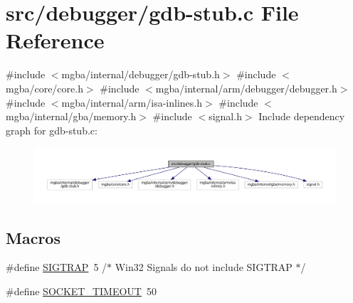 \hypertarget{gdb-stub_8c}{}\section{src/debugger/gdb-\/stub.c File Reference}
\label{gdb-stub_8c}
{\ttfamily \#include $<$mgba/internal/debugger/gdb-\/stub.\+h$>$}\newline
{\ttfamily \#include $<$mgba/core/core.\+h$>$}\newline
{\ttfamily \#include $<$mgba/internal/arm/debugger/debugger.\+h$>$}\newline
{\ttfamily \#include $<$mgba/internal/arm/isa-\/inlines.\+h$>$}\newline
{\ttfamily \#include $<$mgba/internal/gba/memory.\+h$>$}\newline
{\ttfamily \#include $<$signal.\+h$>$}\newline
Include dependency graph for gdb-\/stub.c\+:
\nopagebreak
\begin{figure}[H]
\begin{center}
\leavevmode
\includegraphics[width=350pt]{gdb-stub_8c__incl}
\end{center}
\end{figure}
\subsection*{Macros}
\begin{DoxyCompactItemize}
\item 
\#define \mbox{\hyperlink{gdb-stub_8c_aa2beb906ab1b46676e63823f4e773c38}{S\+I\+G\+T\+R\+AP}}~5 /$\ast$ Win32 Signals do not include S\+I\+G\+T\+R\+AP $\ast$/
\item 
\#define \mbox{\hyperlink{gdb-stub_8c_aca6153015dc94fe7679954a1ff9d9b15}{S\+O\+C\+K\+E\+T\+\_\+\+T\+I\+M\+E\+O\+UT}}~50
\end{DoxyCompactItemize}
